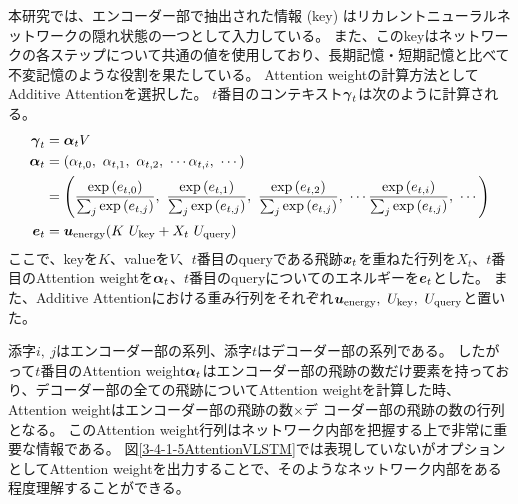 本研究では、エンコーダー部で抽出された情報 (key) はリカレントニューラルネットワークの隠れ状態の一つとして入力している。
また、このkeyはネットワークの各ステップについて共通の値を使用しており、長期記憶・短期記憶と比べて不変記憶のような役割を果たしている。
Attention weightの計算方法としてAdditive Attentionを選択した。
$t$番目のコンテキスト${\mbox{\boldmath{$\gamma$}}}_{t}$は次のように計算される。
\begin{equation}
 \begin{split}
  {\mbox{\boldmath{$\gamma$}}}_{t} 
  &= {\mbox{\boldmath{$\alpha$}}}_{t} V\\
  {\mbox{\boldmath{$\alpha$}}}_{t}
  &= (\alpha_{t,0},\ \alpha_{t,1},\ \alpha_{t,2},\ \cdots \alpha_{t,i},\ \cdots) \\
  &= \left(\frac{\exp{({{e}}_{t,0})}}{\sum_j \exp{({{e}}_{t,j})}},\ \frac{\exp{({{e}}_{t,1})}}{\sum_j \exp{({{e}}_{t,j})}},\ \frac{\exp{({{e}}_{t,2})}}{\sum_j \exp{({{e}}_{t,j})}},\  \cdots \frac{\exp{({{e}}_{t,i})}}{\sum_j \exp{({{e}}_{t,j})}},\ \cdots\right)\\
  {\mbox{\boldmath{$e$}}}_{t}
  &={\mbox{\boldmath{$u$}}}_{\rm energy} (K\ U_{\rm key} + X_t\ U_{\rm query}) \\
 \end{split}
\end{equation}
ここで、keyを$K$、valueを$V$、$t$番目のqueryである飛跡${\mbox{\boldmath{$x$}}}_{t}$を重ねた行列を$X_t$、$t$番目のAttention weightを${\mbox{\boldmath{$\alpha$}}}_{t}$、$t$番目のqueryについてのエネルギーを${\mbox{\boldmath{$e$}}}_{t}$とした。
また、Additive Attentionにおける重み行列をそれぞれ${\mbox{\boldmath{$u$}}}_{\rm energy},\  U_{\rm key},\ U_{\rm query}$と置いた。

添字$i,\ j$はエンコーダー部の系列、添字$t$はデコーダー部の系列である。
したがって$t$番目のAttention weight${\mbox{\boldmath{$\alpha$}}}_{t}$はエンコーダー部の飛跡の数だけ要素を持っており、デコーダー部の全ての飛跡についてAttention weightを計算した時、Attention weightはエンコーダー部の飛跡の数$\times$デ
コーダー部の飛跡の数の行列となる。
このAttention weight行列はネットワーク内部を把握する上で非常に重要な情報である。
図\ref{3-4-1-5AttentionVLSTM}では表現していないがオプションとしてAttention weightを出力することで、そのようなネットワーク内部をある程度理解することができる。

